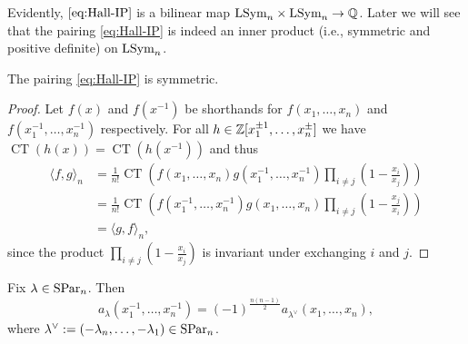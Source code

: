 \documentclass[11pt]{amsart}
\begin{document}
    Evidently, $\cref{eq:Hall-IP}$ is a bilinear map \(\mathrm{LSym}_n \times \mathrm{LSym}_n \to \mathbb{Q}\). Later we will see that the pairing \cref{eq:Hall-IP} is indeed an inner product (i.e., symmetric and positive definite) on $\mathrm{LSym}_n$. 

    \begin{prop} \label{prop:bilin-symm}
    The pairing \cref{eq:Hall-IP} is symmetric. 
    \end{prop}
    \begin{proof}
        Let $f(x)$ and $f(x^{-1})$ be shorthands for $f(x_1, \dots , x_n)$ and $ f(x_1^{-1}, \dots ,x_n^{-1}) $ respectively. For all $h \in \mathbb{Z}[x^{\pm 1}_1, \dots , x_n^{\pm}]$ we have $\operatorname{CT}(h(x)) = \operatorname{CT}(h(x^{-1})) $ and thus 
        \begin{align*}
            \langle f, g \rangle_n
            &= \frac{1}{n!} \operatorname{CT} \left( f(x_1,\dotsc,x_n) g(x_1^{-1},\dotsc,x_n^{-1}) \prod_{i \ne j} \left( 1 - \frac{x_i}{x_j} \right) \right) \\
            &= \frac{1}{n!} \operatorname{CT} \left( f(x_1^{-1},\dotsc,x_n^{-1}) g(x_1,\dotsc,x_n) \prod_{i \ne j} \left( 1 - \frac{x_j}{x_i} \right) \right) \\
            &= \langle g, f \rangle_n,
        \end{align*}
        since the product $\prod_{i \ne j} \left(1 - \frac{x_i}{x_j}\right)$ is invariant under exchanging $i$ and $j$.
        \end{proof}
    
     \begin{lem}\label{lem:tech}
    Fix $\lambda \in \mathrm{SPar}_n$. Then 
         \begin{equation}\label{eq:tild_lamb}
             a_{\lambda}(x_1^{-1}, \dots, x_n^{-1}) = (-1)^{\frac{n(n-1)}{2}}a_{\lambda^\vee}(x_1,\dots,x_n),
         \end{equation}
         where $\lambda^\vee := ( - \lambda_n, \dots, -\lambda_1) \in \mathrm{SPar}_n$.
     \end{lem}
    
\end{document}
